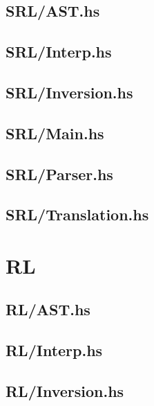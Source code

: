 \subsection{SRL/AST.hs}
\label{app:SRL_AST_hs}

\subsection{SRL/Interp.hs}
\label{app:SRL_Interp_hs}

\subsection{SRL/Inversion.hs}
\label{app:SRL_Inversion_hs}

\subsection{SRL/Main.hs}
\label{app:SRL_Main_hs}

\subsection{SRL/Parser.hs}
\label{app:SRL_Parser_hs}

\subsection{SRL/Translation.hs}
\label{app:SRL_Translation_hs}

\section{RL}
\label{app:interpreter_rl}
\subsection{RL/AST.hs}
\label{app:RL_AST_hs}

\subsection{RL/Interp.hs}
\label{app:RL_Interp_hs}

\subsection{RL/Inversion.hs}
\label{app:RL_Inversion_hs}

